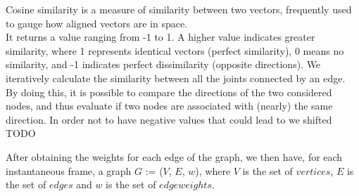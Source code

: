 Cosine similarity is a measure of similarity between two vectors, frequently used to gauge how aligned vectors are in space. \\
It returns a value ranging from -1 to 1.
A higher value indicates greater similarity, where 1 represents identical vectors (perfect similarity), 0 means no similarity, and -1 indicates perfect dissimilarity (opposite directions).
We iteratively calculate the similarity between all the joints connected by an edge.
By doing this, it is possible to compare the directions of the two considered nodes, and thus evaluate if two nodes are associated with
(nearly) the same direction.
In order not to have negative values that could lead to we shifted TODO

After obtaining the weights for each edge of the graph, we then have, for each instantaneous frame, a graph $G$ := ($V$, $E$, $w$), where 
$V$ is the set of $vertices$, $E$ is the set of $edges$ and $w$ is the set of $edge weights$.
